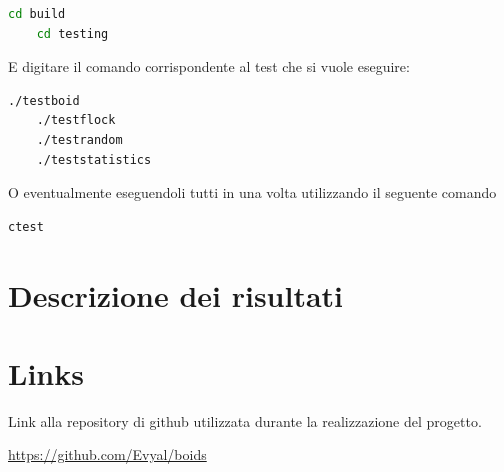 \documentclass[10pt,a4paper]{article}
\begin{document}
\begin{lstlisting}[language=bash]
    cd build
    cd testing
\end{lstlisting}

E digitare il comando corrispondente al test che si vuole eseguire: 

\begin{lstlisting}[language=bash]
    ./testboid
    ./testflock
    ./testrandom
    ./teststatistics
\end{lstlisting}

O eventualmente eseguendoli tutti in una volta utilizzando il seguente comando

\begin{lstlisting}[language=bash]
    ctest
\end{lstlisting}


\section{Descrizione dei risultati}


\section{Links}

\setlength{\parindent}{20pt}
Link alla repository di github utilizzata durante la realizzazione del progetto.

\url{https://github.com/Evyal/boids}
\end{document}
